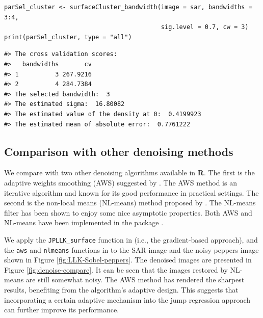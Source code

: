 \begin{verbatim}
parSel_cluster <- surfaceCluster_bandwidth(image = sar, bandwidths = 3:4, 
                                           sig.level = 0.7, cw = 3)
print(parSel_cluster, type = "all")
\end{verbatim}

\begin{verbatim}
#> The cross validation scores:
#>   bandwidths       cv
#> 1          3 267.9216
#> 2          4 284.7384
#> The selected bandwidth:  3 
#> The estimated sigma:  16.80082 
#> The estimated value of the density at 0:  0.4199923 
#> The estimated mean of absolute error:  0.7761222
\end{verbatim}

\subsection{\texorpdfstring{{Comparison with other denoising methods}}{Comparison with other denoising methods}}\label{sec:denoise.compare}

We compare with two other denoising algorithms available in \textbf{R}. The first is the adaptive weights smoothing (AWS) suggested by \citet{polzehl2000adaptive}. The AWS method is an iterative algorithm and known for its good performance in practical settings. The second is the non-local means (NL-means) method proposed by \citet{buades2005review}. The NL-means filter has been shown to enjoy some nice asymptotic properties. Both AWS and NL-means have been implemented in the package  \citep{polzehl2023magnetic, polzehl2020patch}.

We apply the \texttt{JPLLK\_surface} function in  (i.e., the gradient-based approach), and the \texttt{aws} and \texttt{nlmeans} functions in  to the SAR image and the noisy peppers image shown in Figure \ref{fig:LLK-Sobel-peppers}. The denoised images are presented in Figure \ref{fig:denoise-compare}. It can be seen that the images restored by NL-means are still somewhat noisy. The AWS method has rendered the sharpest results, benefiting from the algorithm's adaptive design. This suggests that incorporating a certain adaptive mechanism into the jump regression approach can further improve its performance.




